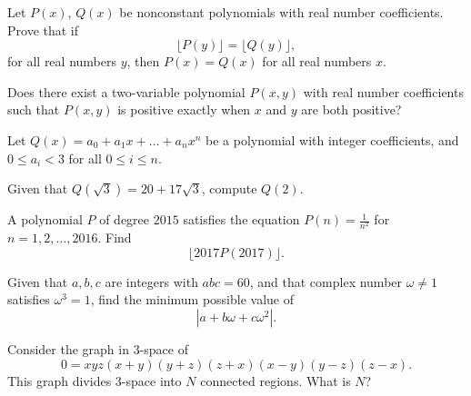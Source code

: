 \begin{question}[name={2017 HMMT, Team, \href{https://artofproblemsolving.com/community/c129h1385981p7707893}{Problem 1}}]
	Let $P(x)$, $Q(x)$ be nonconstant polynomials with real number coefficients. Prove that if
	\[\lfloor P(y) \rfloor = \lfloor Q(y) \rfloor,\]for all real numbers $y$, then $P(x) = Q(x)$ for all real numbers $x$.
\end{question}




\begin{question}[name={2017 HMMT, Team, \href{https://artofproblemsolving.com/community/c129h1385982p7707894}{Problem 2}}]
	Does there exist a two-variable polynomial $P(x, y)$ with real number coefficients such that $P(x, y)$ is positive exactly when $x$ and $y$ are both positive?	
	
\end{question}




\begin{question}[name={2017 HMMT, Algebra \& Number Theory, \href{https://artofproblemsolving.com/community/c129h1386253p7710407}{Problem 1}}]
	Let $Q(x)=a_0+a_1x+\dots+a_nx^n$ be a polynomial with integer coefficients, and $0\le a_i<3$ for all $0\le i\le n$.
	
	Given that $Q(\sqrt{3})=20+17\sqrt{3}$, compute $Q(2)$.
\end{question}




\begin{question}[name={2017 HMMT, Algebra \& Number Theory, \href{https://artofproblemsolving.com/community/c129h1386261p7710445}{Problem 6}}]
	A polynomial $P$ of degree $2015$ satisfies the equation $P(n)=\frac{1}{n^2}$ for $n=1, 2, \dots, 2016$. Find $$\lfloor 2017P(2017)\rfloor.$$
\end{question}





\begin{question}[name={2017 HMMT, November General, \href{https://artofproblemsolving.com/community/c129h1639900p10329176}{Problem 5}}]
	Given that $a,b,c$ are integers with $abc = 60$, and that complex number $\omega \neq 1$ satisfies $\omega^3=1$, find the minimum possible value of $$|a + b\omega + c\omega^2|.$$
\end{question}




\begin{question}[name={2017 HMMT, November Guts, \href{https://artofproblemsolving.com/community/c129h1387204p7718331}{Problem 11}}]
	Consider the graph in $3$-space of
	\[0 = xyz(x + y)(y + z)(z + x)(x - y)(y - z)(z - x).\]This graph divides $3$-space into $N$ connected regions. What is $N$?
\end{question}






